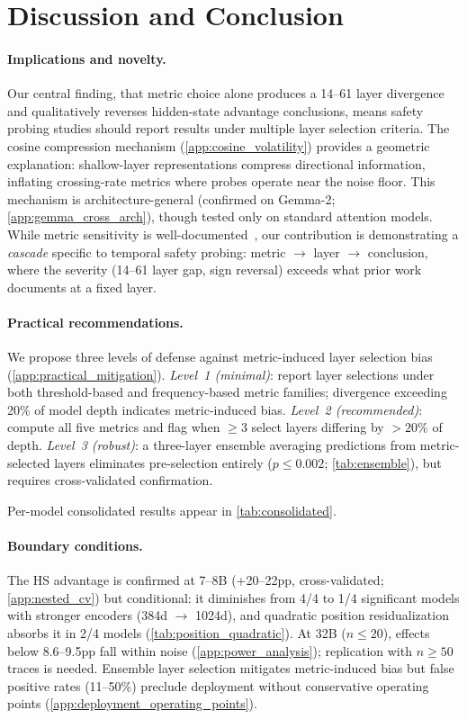 \section{Discussion and Conclusion}\label{sec:discussion}

\paragraph{Implications and novelty.} Our central finding, that metric choice alone produces a 14--61 layer divergence and qualitatively reverses hidden-state advantage conclusions, means safety probing studies should report results under multiple layer selection criteria. The cosine compression mechanism (\cref{app:cosine_volatility}) provides a geometric explanation: shallow-layer representations compress directional information, inflating crossing-rate metrics where probes operate near the noise floor. This mechanism is architecture-general (confirmed on Gemma-2; \cref{app:gemma_cross_arch}), though tested only on standard attention models. While metric sensitivity is well-documented~\citep{belinkov2022probing,voita2020information}, our contribution is demonstrating a \emph{cascade} specific to temporal safety probing: metric $\to$ layer $\to$ conclusion, where the severity (14--61 layer gap, sign reversal) exceeds what prior work documents at a fixed layer.

\paragraph{Practical recommendations.} We propose three levels of defense against metric-induced layer selection bias (\cref{app:practical_mitigation}). \emph{Level~1 (minimal)}: report layer selections under both threshold-based and frequency-based metric families; divergence exceeding 20\% of model depth indicates metric-induced bias. \emph{Level~2 (recommended)}: compute all five metrics and flag when ${\geq}3$ select layers differing by ${>}20\%$ of depth. \emph{Level~3 (robust)}: a three-layer ensemble averaging predictions from metric-selected layers eliminates pre-selection entirely ($p \leq 0.002$; \cref{tab:ensemble}), but requires cross-validated confirmation.

Per-model consolidated results appear in \cref{tab:consolidated}.

\paragraph{Boundary conditions.} The HS advantage is confirmed at 7--8B (+20--22pp, cross-validated; \cref{app:nested_cv}) but conditional: it diminishes from 4/4 to 1/4 significant models with stronger encoders (384d $\to$ 1024d), and quadratic position residualization absorbs it in 2/4 models (\cref{tab:position_quadratic}). At 32B ($n \leq 20$), effects below 8.6--9.5pp fall within noise (\cref{app:power_analysis}); replication with $n \geq 50$ traces is needed. Ensemble layer selection mitigates metric-induced bias but false positive rates (11--50\%) preclude deployment without conservative operating points (\cref{app:deployment_operating_points}).

